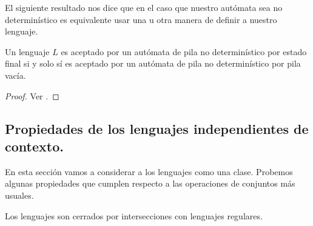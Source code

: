 \documentclass[tesis.tex]{subfiles}
\begin{document}
El siguiente resultado nos dice que en el caso que nuestro autómata sea no determinístico es equivalente usar una u otra manera de definir a nuestro lenguaje.

\medskip
\begin{teo}
Un lenguaje $L$ es aceptado por un autómata de pila no determinístico por estado final si y solo sí es aceptado por un autómata de pila no determinístico por pila vacía.
\end{teo}

\begin{proof}
	Ver \cite{hopcraft-ullman}.
\end{proof}


\subsection{Propiedades de los lenguajes independientes de contexto.}

En esta sección vamos a considerar a los lenguajes \ic como una clase. 
Probemos algunas propiedades que cumplen respecto a las operaciones de conjuntos más usuales.

\begin{prop}\label{intersecciones-reg-ic}
	Los lenguajes \ic son cerrados por intersecciones con lenguajes regulares.
\end{prop}
\end{document}
